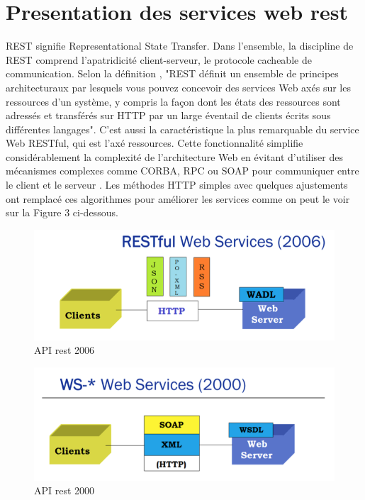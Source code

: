 \section{Presentation des services web rest}
REST signifie Representational State Transfer. Dans l'ensemble, la discipline de REST comprend l'apatridicité client-serveur, le protocole cacheable de communication.
Selon la définition \cite{10}, "REST définit un ensemble de principes architecturaux par lesquels vous pouvez concevoir des services Web axés sur les ressources d'un système, y compris la façon dont les états des ressources sont adressés et transférés sur HTTP par un large éventail de clients écrits sous différentes langages". C'est aussi la caractéristique la plus remarquable du service Web RESTful, qui est l'axé ressources. Cette fonctionnalité simplifie considérablement la complexité de l'architecture Web en évitant d'utiliser des mécanismes complexes comme CORBA, RPC ou SOAP pour communiquer entre le client et le serveur  \cite{7}. Les méthodes HTTP simples avec quelques ajustements ont remplacé ces algorithmes pour améliorer les services comme on peut le voir sur la Figure 3 ci-dessous.
\begin{figure}[! ht ]
			\centering
			\includegraphics[scale=.4]{./images/api_rest_2006.png}
			\caption {API rest 2006}
		\end{figure}
\begin{figure}[! ht ]
			\centering
			\includegraphics[scale=.4]{./images/api_2000.png}
			\caption {API rest 2000}
		\end{figure}
		
